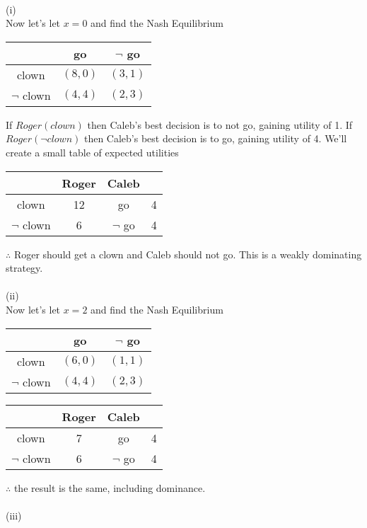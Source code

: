 \documentclass[12pt,letter]{article}
\begin{document}
\\
(i)\\
Now let's let $x=0$ and find the Nash Equilibrium
\begin{figure*}[h]
\centering
\begin{tabular}{|c|c|c|}
	\hline
	& go & $\neg$ go\\
	\hline
	clown & $(8,0)$ & $(3,1)$\\
	\hline
	$\neg$ clown & $(4,4)$ & $(2,3)$\\
	\hline
\end{tabular}
\end{figure*}
If $Roger(clown)$ then Caleb's best decision is to not go, gaining utility of 1.
If $Roger(\neg clown)$ then Caleb's best decision is to go, gaining utility of 4.
We'll create a small table of expected utilities
\begin{figure*}[h!]
\centering
\begin{tabular}{c c|c c}
	& Roger & Caleb\\
	\hline
	clown & 12 & go & 4\\
	$\neg$ clown & 6 & $\neg$ go & 4
\end{tabular}
\end{figure*}
\FloatBarrier
$\therefore$ Roger should get a clown and Caleb should not go. This is a 
weakly dominating strategy.
\\
\\
(ii)\\
Now let's let $x=2$ and find the Nash Equilibrium
\begin{figure*}[h!]
\centering
\begin{tabular}{|c|c|c|}
	\hline
	& go & $\neg$ go\\
	\hline
	clown & $(6,0)$ & $(1,1)$\\
	\hline
	$\neg$ clown & $(4,4)$ & $(2,3)$\\
	\hline
\end{tabular}
\end{figure*}
\begin{figure*}[h!]
\centering
\begin{tabular}{c c|c c}
	& Roger & Caleb\\
	\hline
	clown & 7 & go & 4\\
	$\neg$ clown & 6 & $\neg$ go & 4
\end{tabular}
\end{figure*}
\FloatBarrier
$\therefore$ the result is the same, including dominance.
\\
\\
(iii)\\
\end{document}
